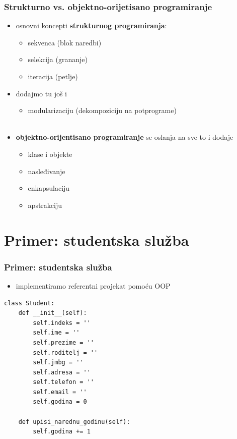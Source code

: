 \documentclass[utf8,compress]{beamer}
\begin{document}
\begin{frame}[fragile]
  \frametitle{Strukturno vs. objektno-orijetisano programiranje}
  \begin{itemize}
    \item osnovni koncepti \textbf{strukturnog programiranja}:
    \begin{itemize}
      \item sekvenca (blok naredbi)
      \item selekcija (grananje)
      \item iteracija (petlje)
    \end{itemize}
    \item dodajmo tu još i
    \begin{itemize}
      \item modularizaciju (dekompoziciju na potprograme) \\ \ \\
    \end{itemize}
    \item \textbf{objektno-orijentisano programiranje} se oslanja na sve to i dodaje
    \begin{itemize}
      \item klase i objekte
      \item nasleđivanje
      \item enkapsulaciju
      \item apstrakciju
    \end{itemize}
  \end{itemize}
\end{frame}

\section[Primer]{Primer: studentska služba}

\begin{frame}[fragile]
  \frametitle{Primer: studentska služba}
  \begin{itemize}
    \item implementiramo referentni projekat pomoću OOP
  \end{itemize}
\begin{verbatim}
class Student:
    def __init__(self):
        self.indeks = ''
        self.ime = ''
        self.prezime = ''
        self.roditelj = ''
        self.jmbg = ''
        self.adresa = ''
        self.telefon = ''
        self.email = ''
        self.godina = 0

    def upisi_narednu_godinu(self):
        self.godina += 1

\end{verbatim}
\end{frame}
\end{document}
